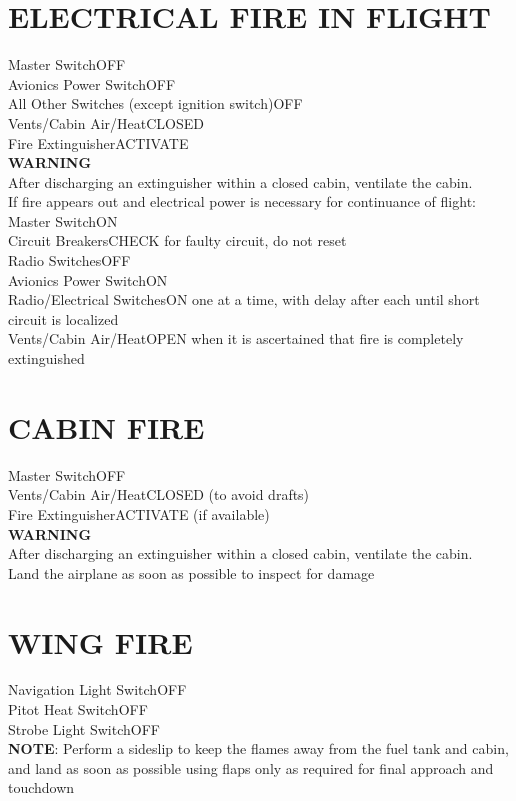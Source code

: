 \documentclass{article}
\begin{document}
\begin{multicols*}{2}
\section*{ELECTRICAL FIRE IN FLIGHT}
Master Switch\dotfill OFF\\
Avionics Power Switch\dotfill OFF\\
All Other Switches (except ignition switch)\dotfill OFF\\
Vents/Cabin Air/Heat\dotfill CLOSED\\
Fire Extinguisher\dotfill ACTIVATE\\
\centering \textbf{WARNING}\\
After discharging an extinguisher within a closed cabin, ventilate the cabin.\\
If fire appears out and electrical power is necessary for continuance of flight:\\
Master Switch\dotfill ON\\
Circuit Breakers\dotfill CHECK for faulty circuit, do not reset\\
Radio Switches\dotfill OFF\\
Avionics Power Switch\dotfill ON\\
Radio/Electrical Switches\dotfill ON one at a time, with delay after each until short circuit is localized\\
Vents/Cabin Air/Heat\dotfill OPEN when it is ascertained that fire is completely extinguished
\section*{CABIN FIRE}
Master Switch\dotfill OFF\\
Vents/Cabin Air/Heat\dotfill CLOSED (to avoid drafts)\\
Fire Extinguisher\dotfill ACTIVATE (if available)\\
\centering \textbf{WARNING}\\
After discharging an extinguisher within a closed cabin, ventilate the cabin.\\
Land the airplane as soon as possible to inspect for damage
\section*{WING FIRE}
Navigation Light Switch\dotfill OFF\\
Pitot Heat Switch\dotfill OFF\\
Strobe Light Switch\dotfill OFF\\
\centering \textbf{NOTE}:
Perform a sideslip to keep the flames away from the fuel tank and cabin, and land as soon as possible using flaps only as required for final approach and touchdown

\end{multicols*}
\end{document}
